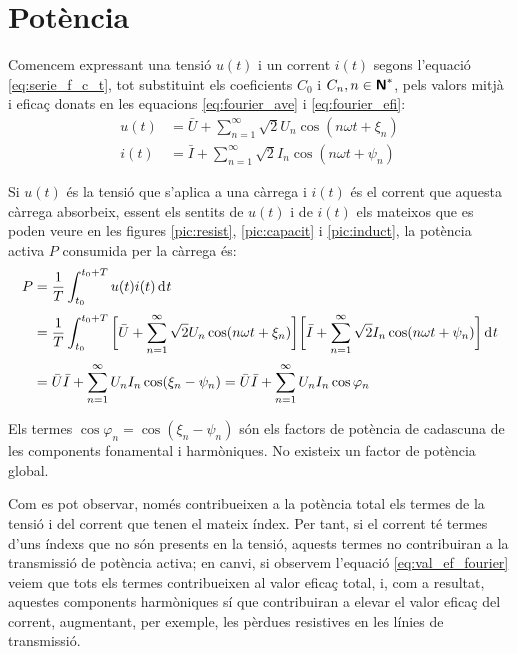 \section{Potència}

Comencem expressant una tensió $u(t)$ i un corrent $i(t)$
 segons l'equació \eqref{eq:serie_f_c_t}, tot substituint els
 coeficients $C_0$ i $C_n, n \in {\ensuremath{\boldsymbol{\mathsf{N}}}}^*$, pels valors mitjà i eficaç
 donats en les equacions \eqref{eq:fourier_ave} i \eqref{eq:fourier_efi}:
 \begin{align}
    u(t)  &= \bar{U} + \sum_{n=1}^\infty \sqrt{2} U_n \cos (n \omega t +
    \xi_n)\\[0.5ex]
    i(t)  &= \bar{I} + \sum_{n=1}^\infty \sqrt{2} I_n \cos (n \omega t + \psi_n)
 \end{align}

Si  $u(t)$ és la tensió que s'aplica a una càrrega i $i(t)$ és el
corrent que aquesta càrrega absorbeix, essent els sentits de $u(t)$
i de $i(t)$ els mateixos que es poden veure en les figures
\ref{pic:resist}, \ref{pic:capacit} i \ref{pic:induct}, la potència
activa $P$ consumida per la càrrega és:
\begin{equation}\begin{split}
    P &= \frac{1}{T} \int_{t_0}^{t_0+T} u(t) i(t) \diff t 
    \\[0.5ex]
     &= \frac{1}{T} \int_{t_0}^{t_0+T} \bigg[\bar{U} + \sum_{n=1}^\infty
    \sqrt{2} U_n \cos (n \omega t + \xi_n) \bigg]
    \bigg[\bar{I} + \sum_{n=1}^\infty \sqrt{2} I_n
    \cos (n \omega t + \psi_n)\bigg] \diff t\\[0.5ex]
    &=\bar{U} \bar{I} + \sum_{n=1}^\infty U_n I_n
    \cos(\xi_n-\psi_n) = \bar{U} \bar{I} + \sum_{n=1}^\infty U_n I_n
    \cos \varphi_n \label{eq:pot_fu}
\end{split}\end{equation}

Els termes $\cos \varphi_n=\cos (\xi_n-\psi_n)$ són els factors de
potència de cadascuna de les components fonamental i harmòniques. No
existeix un factor de potència global.

 Com es pot observar, només contribueixen a la potència
total els termes de la tensió i del corrent que tenen el mateix
índex. Per tant, si el corrent té termes d'uns índexs que no són
presents en la tensió, aquests termes no contribuiran a la
transmissió de  potència activa; en canvi, si observem l'equació
\eqref{eq:val_ef_fourier} veiem que tots els termes contribueixen al
valor eficaç total, i, com a resultat, aquestes components harmòniques sí que
contribuiran a elevar el valor eficaç del corrent, augmentant, per exemple, 
 les pèrdues resistives en les línies de transmissió.

